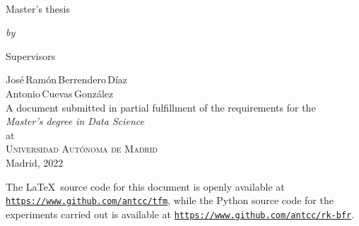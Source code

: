 
\begin{titlepage}
  \vspace*{5cm}
  \makeatletter
  \begin{center}
    \begin{singlespace*}
    \begin{Huge}
      \@title
    \end{Huge}\\[1cm]
    \begin{Large}
      Master's thesis
    \end{Large}
    \vskip 0.1cm
    \begin{large}
    \emph{by}
  \end{large}
    \vskip 0.175cm
    \begin{Large}
    \textsc{\@author}
  \end{Large}
  \end{singlespace*}
    \vfill
    \begin{large}
    Supervisors
  \end{large}
    \vskip 0.1cm
    José\,Ramón\,Berrendero\,Díaz\\
    Antonio\,Cuevas\,González\\[1cm]

    A document submitted in partial fulfillment
    of the requirements for the\\
    \emph{Master's degree in Data Science}\\
    at\\
    \textsc{Universidad Autónoma de Madrid}\\[1cm]

    Madrid, 2022
  \end{center}
  \makeatother
\end{titlepage}
\newpage


\thispagestyle{empty}
\null
\newpage



\thispagestyle{empty}
\pagebreak
\hspace{0pt}
\vfill
\begin{center}
    \begin{minipage}[t]{12.5cm}
        \doclicenseThis
        The \LaTeX\ source code for this document is openly available at \texttt{\url{https://www.github.com/antcc/tfm}}, while the Python source code for the experiments carried out is available at \texttt{\url{https://www.github.com/antcc/rk-bfr}}.
    \end{minipage}
\end{center}
\vfill
\hspace{0pt}
\pagebreak
\newpage

\thispagestyle{empty}
\null
\newpage
